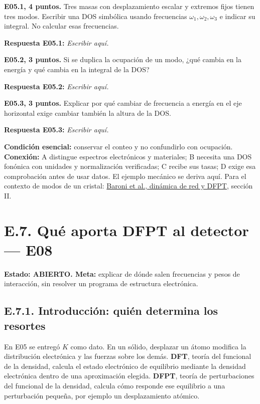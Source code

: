 \documentclass[
  spanish,
  10pt,
  a4paper,
]{article}
\begin{document}

\textbf{E05.1, 4 puntos.} Tres masas con desplazamiento escalar y
extremos fijos tienen tres modos. Escribir una DOS simbólica usando
frecuencias \(\omega_1,\omega_2,\omega_3\) e indicar su integral. No
calcular esas frecuencias.

\textbf{Respuesta E05.1:} \emph{Escribir aquí.}


\textbf{E05.2, 3 puntos.} Si se duplica la ocupación de un modo, ¿qué
cambia en la energía y qué cambia en la integral de la DOS?

\textbf{Respuesta E05.2:} \emph{Escribir aquí.}


\textbf{E05.3, 3 puntos.} Explicar por qué cambiar de frecuencia a
energía en el eje horizontal exige cambiar también la altura de la DOS.

\textbf{Respuesta E05.3:} \emph{Escribir aquí.}

\textbf{Condición esencial:} conservar el conteo y no confundirlo con
ocupación. \textbf{Conexión:} A distingue espectros electrónicos y
materiales; B necesita una DOS fonónica con unidades y normalización
verificadas; C recibe sus tasas; D exige esa comprobación antes de usar
datos. El ejemplo mecánico se deriva aquí. Para el contexto de modos de
un cristal: \href{https://arxiv.org/abs/cond-mat/0012092}{Baroni et al.,
dinámica de red y DFPT}, sección II.


\section{E.7. Qué aporta DFPT al detector ---
E08}\label{e.7.-quuxe9-aporta-dfpt-al-detector-e08}

\textbf{Estado: ABIERTO. Meta:} explicar de dónde salen frecuencias y
pesos de interacción, sin resolver un programa de estructura
electrónica.

\subsection{E.7.1. Introducción: quién determina los
resortes}\label{e.7.1.-introducciuxf3n-quiuxe9n-determina-los-resortes}

En E05 se entregó \(K\) como dato. En un sólido, desplazar un átomo
modifica la distribución electrónica y las fuerzas sobre los demás.
\textbf{DFT}, teoría del funcional de la densidad, calcula el estado
electrónico de equilibrio mediante la densidad electrónica dentro de una
aproximación elegida. \textbf{DFPT}, teoría de perturbaciones del
funcional de la densidad, calcula cómo responde ese equilibrio a una
perturbación pequeña, por ejemplo un desplazamiento atómico.
\end{document}
